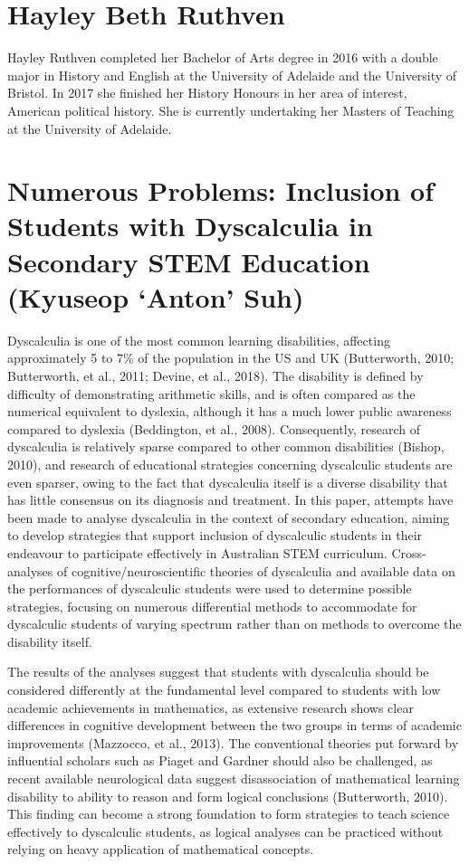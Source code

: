 \documentclass[twoside,12pt,a4paper,notitlepage]{memoir}
\begin{document}
\section*{Hayley Beth Ruthven}

Hayley Ruthven completed her Bachelor of Arts degree in 2016 with a double major in History and English at the University of Adelaide and the University of Bristol. In 2017 she finished her History Honours in her area of interest, American political history. She is currently undertaking her Masters of Teaching at the University of Adelaide.


\pagebreak
\section*{Numerous Problems: Inclusion of Students with Dyscalculia in Secondary STEM Education (Kyuseop `Anton' Suh)}
\label{aut:suh}


Dyscalculia is one of the most common learning disabilities, affecting approximately 5 to 7\% of the population in the US and UK (Butterworth, 2010; Butterworth, et al., 2011; Devine, et al., 2018). The disability is defined by difficulty of demonstrating arithmetic skills, and is often compared as the numerical equivalent to dyslexia, although it has a much lower public awareness compared to dyslexia (Beddington, et al., 2008). Consequently, research of dyscalculia is relatively sparse compared to other common disabilities (Bishop, 2010), and research of educational strategies concerning dyscalculic students are even sparser, owing to the fact that dyscalculia itself is a diverse disability that has little consensus on its diagnosis and treatment. In this paper, attempts have been made to analyse dyscalculia in the context of secondary education, aiming to develop strategies that support inclusion of dyscalculic students in their endeavour to participate effectively in Australian STEM curriculum. Cross-analyses of cognitive/neuroscientific theories of dyscalculia and available data on the performances of dyscalculic students were used to determine possible strategies, focusing on numerous differential methods to accommodate for dyscalculic students of varying spectrum rather than on methods to overcome the disability itself.

The results of the analyses suggest that students with dyscalculia should be considered differently at the fundamental level compared to students with low academic achievements in mathematics, as extensive research shows clear differences in cognitive development between the two groups in terms of academic improvements (Mazzocco, et al., 2013). The conventional theories put forward by influential scholars such as Piaget and Gardner should also be challenged, as recent available neurological data suggest disassociation of mathematical learning disability to ability to reason and form logical conclusions (Butterworth, 2010). This finding can become a strong foundation to form strategies to teach science effectively to dyscalculic students, as logical analyses can be practiced without relying on heavy application of mathematical concepts.
\end{document}
